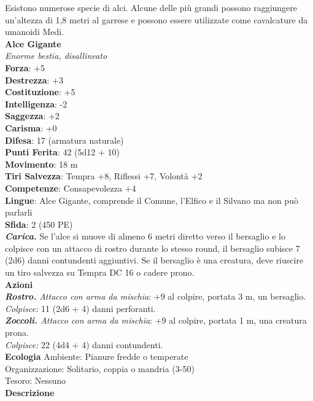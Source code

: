 \begin{multicols}{2}
Esistono numerose specie di alci. Alcune delle più grandi possono raggiungere un'altezza di 1,8 metri al garrese e possono essere utilizzate come cavalcature da umanoidi Medi.\\

\medskip\textbf{Alce Gigante}\\
\emph{Enorme bestia, disallineato}\\
\textbf{Forza}: +5\\
\textbf{Destrezza}: +3\\
\textbf{Costituzione}: +5\\
\textbf{Intelligenza}: -2\\
\textbf{Saggezza}: +2\\
\textbf{Carisma}: +0\\
\textbf{Difesa}: 17 (armatura naturale)\\
\textbf{Punti Ferita}: 42 (5d12 + 10)\\
\textbf{Movimento}: 18 m\\
\textbf{Tiri Salvezza}:  Tempra +8, Riflessi +7, Volontà +2\\
\textbf{Competenze}: Consapevolezza +4\\
\textbf{Lingue}: Alce Gigante, comprende il Comune, l'Elfico e il Silvano ma non può parlarli\\
\textbf{Sfida}: 2 (450 PE)\smallskip\\
\emph{\textbf{Carica.}} Se l'alce si muove di almeno 6 metri diretto verso il bersaglio e lo colpisce con un attacco di rostro durante lo stesso round, il bersaglio subisce 7 (2d6) danni contundenti aggiuntivi. Se il bersaglio è una creatura, deve riuscire un tiro salvezza su Tempra DC  16 o cadere prono.\\
\smallskip\textbf{Azioni}\\
\emph{\textbf{Rostro.} Attacco con arma da mischia}: +9 al colpire, portata 3 m, un bersaglio.\\
\emph{Colpisce:} 11 (2d6 + 4) danni perforanti.\\
\emph{\textbf{Zoccoli.} Attacco con arma da mischia}: +9 al colpire, portata 1 m, una creatura prona.\\
\emph{Colpisce:} 22 (4d4 + 4) danni contundenti.\\
\textbf{Ecologia}
Ambiente: Pianure fredde o temperate\\
Organizzazione: Solitario, coppia o mandria (3-50)\\
Tesoro: Nessuno\\
\textbf{Descrizione}

\end{multicols}
